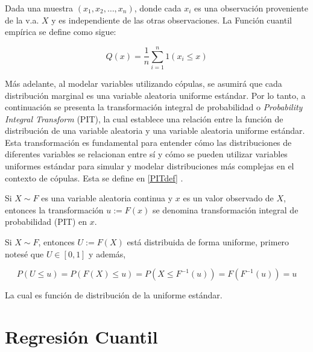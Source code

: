 \begin{defn}
    Dada una muestra $(x_1, x_2, \dots, x_n)$, donde cada $x_i$ es una observación proveniente de la v.a. $X$ y es independiente de las otras observaciones. La Función cuantil empírica se define como sigue:

    \begin{equation}
        \widehat{Q}(x) = \frac{1}{n}\sum _{i = 1}^{n}  1(x_{i} \leq x)
    \end{equation}
\end{defn}

Más adelante, al modelar variables utilizando cópulas, se asumirá que cada distribución marginal es una variable aleatoria uniforme estándar. Por lo tanto, a continuación se presenta la transformación integral de probabilidad o \textit{Probability Integral Transform} (PIT), la cual establece una relación entre la función de distribución de una variable aleatoria y una variable aleatoria uniforme estándar. Esta transformación es fundamental para entender cómo las distribuciones de diferentes variables se relacionan entre sí y cómo se pueden utilizar variables uniformes estándar para simular y modelar distribuciones más complejas en el contexto de cópulas. Esta se define en \ref{PITdef} \cite{CopulasR}.

\begin{defn}\label{PITdef}
    Si $X \sim F$ es una variable aleatoria continua y $x$ es un valor observado de $X$, entonces la transformación $u := F(x)$ se denomina transformación integral de probabilidad (PIT) en $x$.
\end{defn}

\begin{obs}\label{PITdist}
    Si $X \sim F$, entonces $U := F(X)$ está distribuida de forma uniforme, primero notesé que $U \in [0, 1]$ y además, 

    \begin{equation}
        P(U \leq u)=P(F(X) \leq u)=P\left(X \leq F^{-1}(u)\right)=F\left(F^{-1}(u)\right)=u
    \end{equation}

    La cual es función de distribución de la uniforme estándar.
\end{obs}



\section{Regresión Cuantil}
    
